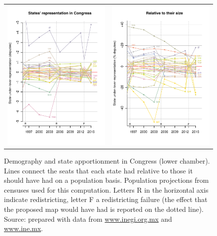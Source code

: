 \documentclass[letter,12pt]{article}
\begin{document}
\begin{figure}
\begin{center}
  \begin{tabular}{cc}
    \includegraphics[width=.45\columnwidth]{statesUnderOverRep.pdf} & 
    \includegraphics[width=.45\columnwidth]{statesUnderOverRep-rel.pdf} \\ 
  \end{tabular}
  \caption{Demography and state apportionment in Congress (lower chamber). Lines connect the seats that each state had relative to those it should have had on a population basis. Population projections from censuses used for this computation. Letters R in the horizontal axis indicate redistricting, letter F a redistricting failure (the effect that the proposed map would have had is reported on the dotted line). Source: prepared with data from \url{www.inegi.org.mx} and \url{www.ine.mx}.}\label{F:underOverRep}
\end{center}
\end{figure}
\end{document}
